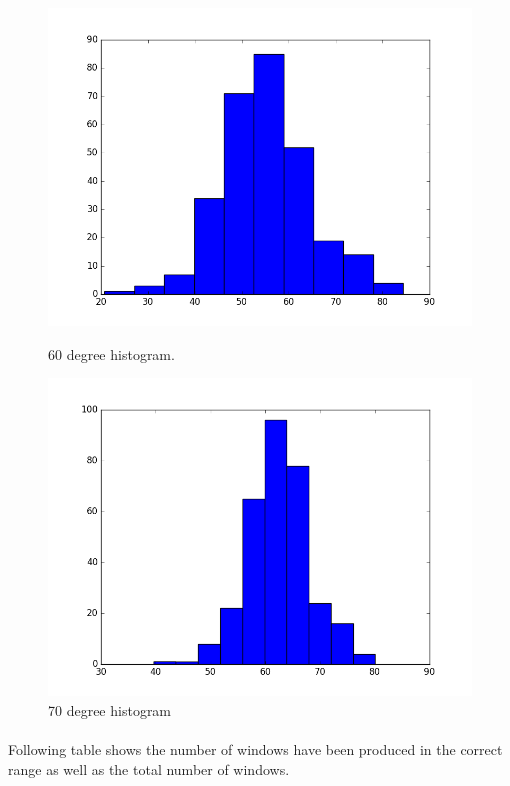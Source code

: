 \documentclass[12pt]{article}
\numberwithin{figure}{section}
\numberwithin{table}{section}
\begin{document}
\begin{figure}[H]
  \centering
  \begin{minipage}[b]{0.4\textwidth}
    \includegraphics[width=\textwidth]{figure_60.png}
    \caption{60 degree histogram.}
  \end{minipage}
  \hfill
  \begin{minipage}[b]{0.4\textwidth}
    \includegraphics[width=\textwidth]{figure_70.png}
    \caption{70 degree histogram}
  \end{minipage}
\end{figure}

\paragraph{}
Following table shows the number of windows have been produced in the correct range as well as the total number of windows.
\end{document}
